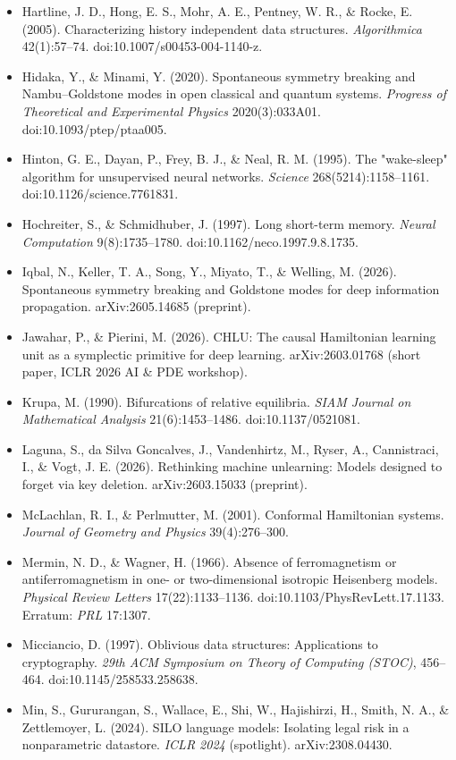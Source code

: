 \documentclass{article}
\begin{document}
\begin{itemize}
\item Hartline, J. D., Hong, E. S., Mohr, A. E., Pentney, W. R., \& Rocke, E. (2005). Characterizing history independent data structures. \emph{Algorithmica} 42(1):57--74. doi:10.1007/s00453-004-1140-z.
\item Hidaka, Y., \& Minami, Y. (2020). Spontaneous symmetry breaking and Nambu--Goldstone modes in open classical and quantum systems. \emph{Progress of Theoretical and Experimental Physics} 2020(3):033A01. doi:10.1093/ptep/ptaa005.
\item Hinton, G. E., Dayan, P., Frey, B. J., \& Neal, R. M. (1995). The "wake-sleep" algorithm for unsupervised neural networks. \emph{Science} 268(5214):1158--1161. doi:10.1126/science.7761831.
\item Hochreiter, S., \& Schmidhuber, J. (1997). Long short-term memory. \emph{Neural Computation} 9(8):1735--1780. doi:10.1162/neco.1997.9.8.1735.
\item Iqbal, N., Keller, T. A., Song, Y., Miyato, T., \& Welling, M. (2026). Spontaneous symmetry breaking and Goldstone modes for deep information propagation. arXiv:2605.14685 (preprint).
\item Jawahar, P., \& Pierini, M. (2026). CHLU: The causal Hamiltonian learning unit as a symplectic primitive for deep learning. arXiv:2603.01768 (short paper, ICLR 2026 AI \& PDE workshop).
\item Krupa, M. (1990). Bifurcations of relative equilibria. \emph{SIAM Journal on Mathematical Analysis} 21(6):1453--1486. doi:10.1137/0521081.
\item Laguna, S., da Silva Goncalves, J., Vandenhirtz, M., Ryser, A., Cannistraci, I., \& Vogt, J. E. (2026). Rethinking machine unlearning: Models designed to forget via key deletion. arXiv:2603.15033 (preprint).
\item McLachlan, R. I., \& Perlmutter, M. (2001). Conformal Hamiltonian systems. \emph{Journal of Geometry and Physics} 39(4):276--300.
\item Mermin, N. D., \& Wagner, H. (1966). Absence of ferromagnetism or antiferromagnetism in one- or two-dimensional isotropic Heisenberg models. \emph{Physical Review Letters} 17(22):1133--1136. doi:10.1103/PhysRevLett.17.1133. Erratum: \emph{PRL} 17:1307.
\item Micciancio, D. (1997). Oblivious data structures: Applications to cryptography. \emph{29th ACM Symposium on Theory of Computing (STOC)}, 456--464. doi:10.1145/258533.258638.
\item Min, S., Gururangan, S., Wallace, E., Shi, W., Hajishirzi, H., Smith, N. A., \& Zettlemoyer, L. (2024). SILO language models: Isolating legal risk in a nonparametric datastore. \emph{ICLR 2024} (spotlight). arXiv:2308.04430.

\end{itemize}
\end{document}
